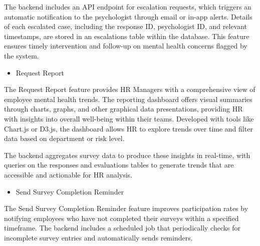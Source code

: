 \documentclass[conference]{IEEEtran}
\begin{document}
            The backend includes an API endpoint 
            for escalation requests, which triggers an automatic 
            notification to the psychologist through email or in-app 
            alerts. Details of each escalated case, including the response
            ID, psychologist ID, and relevant timestamps, are stored in an
            escalations table within the database. This feature ensures 
            timely intervention and follow-up on mental health concerns
            flagged by the system.
            \newline    

            \begin{itemize}
                \item Request Report
            \end{itemize}
    
            The Request Report feature provides HR Managers with a 
            comprehensive view of employee mental health trends. The 
            reporting dashboard offers visual summaries through charts, 
            graphs, and other graphical data presentations, providing HR
            with insights into overall well-being within their teams. 
            Developed with tools like Chart.js or D3.js, the dashboard 
            allows HR to explore trends over time and filter data based 
            on department or risk level. \newline
     
            The backend aggregates survey 
            data to produce these insights in real-time, with queries on 
            the responses and evaluations tables to generate trends that 
            are accessible and actionable for HR analysis.
            \newline    

            \begin{itemize}
                \item Send Survey Completion Reminder
            \end{itemize}
    
            The Send Survey Completion Reminder feature improves 
            participation rates by notifying employees who have not 
            completed their surveys within a specified timeframe. The 
            backend includes a scheduled job that periodically checks 
            for incomplete survey entries and automatically sends 
            reminders. \newline
    
\end{document}
